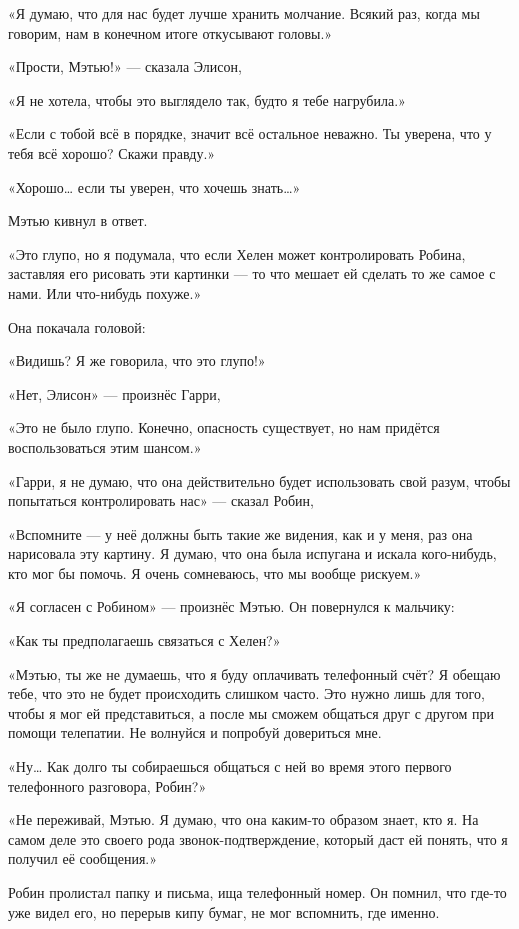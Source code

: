 \documentclass[a5paper, 9pt,
final, openany, twoside=true]{memoir}
\begin{document}
«Я думаю, что для нас будет лучше хранить молчание. Всякий раз, когда мы говорим, нам в конечном итоге откусывают головы.»

«Прости, Мэтью!» — сказала Элисон,

«Я не хотела, чтобы это выглядело так, будто я тебе нагрубила.»

«Если с тобой всё в порядке, значит всё остальное неважно. Ты уверена, что у тебя всё хорошо? Скажи правду.»

«Хорошо… если ты уверен, что хочешь знать…»

Мэтью кивнул в ответ.

«Это глупо, но я подумала, что если Хелен может контролировать Робина, заставляя его рисовать эти картинки — то что мешает ей сделать то же самое с нами. Или что-нибудь похуже.»

Она покачала головой:

«Видишь? Я же говорила, что это глупо!»

«Нет, Элисон» — произнёс Гарри,

«Это не было глупо. Конечно, опасность существует, но нам придётся воспользоваться этим шансом.»

«Гарри, я не думаю, что она действительно будет использовать свой разум, чтобы попытаться контролировать нас» — сказал Робин,

«Вспомните — у неё должны быть такие же видения, как и у меня, раз она нарисовала эту картину. Я думаю, что она была испугана и искала кого-нибудь, кто мог бы помочь. Я очень сомневаюсь, что мы вообще рискуем.»

«Я согласен с Робином» — произнёс Мэтью. Он повернулся к мальчику:

«Как ты предполагаешь связаться с Хелен?»

«Мэтью, ты же не думаешь, что я буду оплачивать телефонный счёт? Я обещаю тебе, что это не будет происходить слишком часто. Это нужно лишь для того, чтобы я мог ей представиться, а после мы сможем общаться друг с другом при помощи телепатии. Не волнуйся и попробуй довериться мне.

«Ну… Как долго ты собираешься общаться с ней во время этого первого телефонного разговора, Робин?»

«Не переживай, Мэтью. Я думаю, что она каким-то образом знает, кто я. На самом деле это своего рода звонок-подтверждение, который даст ей понять, что я получил её сообщения.»

Робин пролистал папку и письма, ища телефонный номер. Он помнил, что где-то уже видел его, но перерыв кипу бумаг, не мог вспомнить, где именно.
\end{document}
